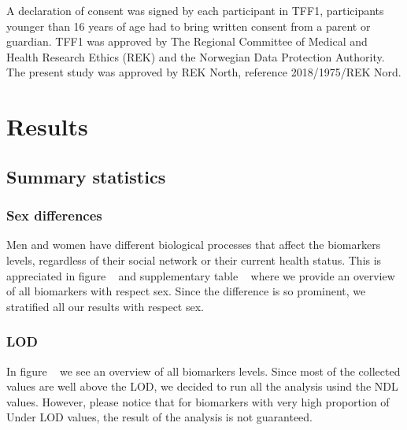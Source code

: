 \documentclass[10pt, a4paper, twocolumn]{article} %
\begin{document}
A declaration of consent was signed by each participant in TFF1, participants younger than 16 years of age had to bring written consent from a parent or guardian. TFF1 was approved by The Regional Committee of Medical and Health Research Ethics (REK) and the Norwegian Data Protection Authority. The present study was approved by REK North, reference 2018/1975/REK Nord. \\


\section{Results}

\subsection{Summary statistics}

\subsubsection{Sex differences}



Men and women have different biological processes that affect the biomarkers levels, regardless of their social network or their current health status. This is appreciated in figure ~\cite{fig:BiomarkersBySexDifference} and supplementary table ~\cite{table:SexDifferencesBiomakers} where we provide an overview of all biomarkers with respect sex. Since the difference is so prominent, we stratified all our results with respect sex.\\

	

\subsubsection{LOD}

In figure ~\cite{fig:LODLevelsOverview} we see an overview of all biomarkers levels. Since most of the collected values are well above the LOD, we decided to run all the analysis usind the NDL values. However, please notice that for biomarkers with very high proportion of Under LOD values, the result of the analysis is not guaranteed.\\
\end{document}
